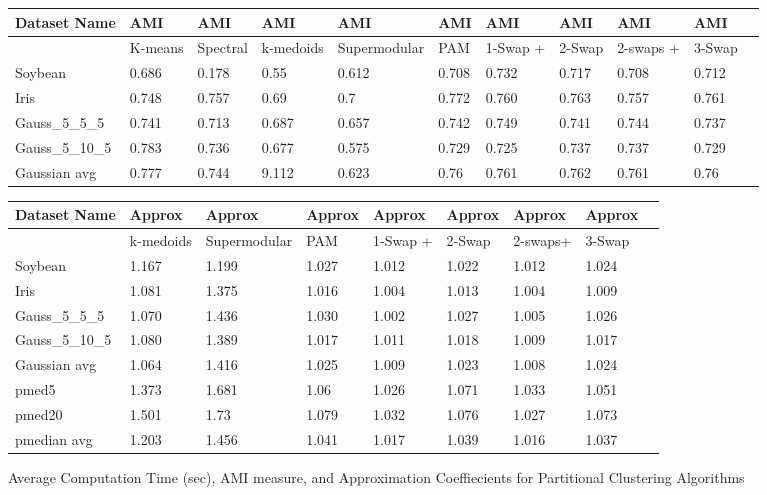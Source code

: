 \documentclass{article}
\begin{document}
\begin{figure*}[h]
\begin{tabular}{ | l | l | l | l | l | l | l | l | l | l | l | }
\hline
	Dataset Name & AMI & AMI & AMI & AMI & AMI & AMI & AMI & AMI & AMI  \\ \hline
	& K-means & Spectral & k-medoids & Supermodular & PAM & 1-Swap + & 2-Swap & 2-swaps + & 3-Swap   \\ \hline
	Soybean & 0.686 & 0.178 & 0.55 & 0.612 & 0.708 & 0.732 & 0.717 & 0.708 & 0.712 \\ 
	Iris & 0.748 & 0.757 & 0.69 & 0.7 & 0.772 & 0.760 & 0.763 & 0.757 & 0.761 \\ 
	Gauss\_5\_5\_5 & 0.741 & 0.713 & 0.687 & 0.657 & 0.742 & 0.749 & 0.741 & 0.744 & 0.737  \\ 
	Gauss\_5\_10\_5 & 0.783 & 0.736 & 0.677 & 0.575 & 0.729 & 0.725 & 0.737 & 0.737& 0.729  \\ 
	Gaussian avg & 0.777 & 0.744 & 9.112 & 0.623 & 0.76 & 0.761 & 0.762 & 0.761 & 0.76 \\ \hline
\end{tabular}
\vspace{0.2 cm}

\begin{tabular}{ | l | l | l | l | l | l | l | l | l | }
\hline
	Dataset Name & Approx & Approx & Approx & Approx & Approx & Approx & Approx  \\ \hline
	& k-medoids & Supermodular & PAM & 1-Swap + & 2-Swap & 2-swaps+ & 3-Swap   \\ \hline
	Soybean & 1.167 & 1.199 & 1.027 & 1.012 & 1.022 & 1.012 & 1.024 \\ 
	Iris & 1.081 & 1.375 & 1.016 & 1.004 & 1.013 & 1.004 & 1.009 \\ 
	Gauss\_5\_5\_5 & 1.070 & 1.436 & 1.030 & 1.002 & 1.027 & 1.005 & 1.026  \\ 
	Gauss\_5\_10\_5 & 1.080 & 1.389 & 1.017 & 1.011 & 1.018 & 1.009 & 1.017  \\ 
	Gaussian avg & 1.064 & 1.416 & 1.025 & 1.009 & 1.023 & 1.008 & 1.024 \\ 
	pmed5 & 1.373 & 1.681 & 1.06 & 1.026 & 1.071 & 1.033 & 1.051 \\ 
	pmed20 & 1.501 & 1.73 & 1.079 & 1.032 & 1.076 & 1.027 & 1.073 \\ 
	pmedian avg & 1.203 & 1.456 & 1.041 & 1.017 & 1.039 & 1.016 & 1.037 \\ \hline
\end{tabular}


\caption{Average Computation Time (sec), AMI measure, and Approximation Coeffiecients for Partitional Clustering Algorithms}
\end{figure*}
\end{document}
